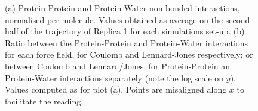\begin{figure}[h!]
\centering
\vspace{3cm}
\caption[Non-bonded protein energy contribution to buckyball bilayer structures]{(a) Protein-Protein and Protein-Water non-bonded interactions, normalised per molecule. Values obtained as average on the second half of the trajectory of Replica 1 for each simulations set-up. (b) Ratio between the Protein-Protein and Protein-Water interactions for each force field, for Coulomb and Lennard-Jones respectively; or between Coulomb and Lennard/Jones, for Protein-Protein an Protein-Water interactions separately (note the log scale on $y$). Values computed as for plot (a). Points are misaligned along $x$ to facilitate the reading.}
\label{fig:eng_cg}
\vspace{3cm}
\end{figure}

